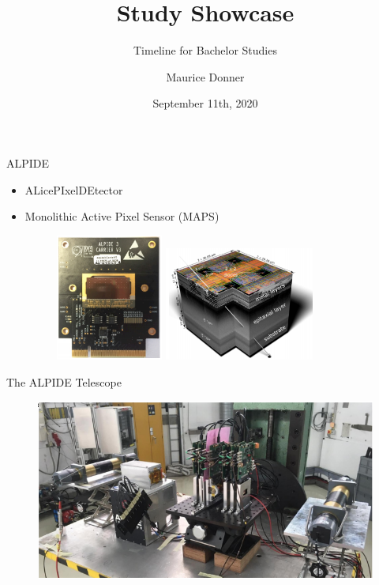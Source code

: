 \documentclass{beamer}
\title{\texorpdfstring{\color{blue!50!black}\textbf{Study Showcase}}{}}
\subtitle{Timeline for Bachelor Studies}
\author{Maurice Donner}
\date{September 11th, 2020}
\begin{document}
\begin{frame}{ALPIDE}
    \begin{itemize}
	\item ALicePIxelDEtector
	\item Monolithic Active Pixel Sensor (MAPS) \\[.5cm]
	    \begin{figure}[H]
		\centering
		\includegraphics[width=100pt]{ALPIDE.png}
		\quad
		\includegraphics[width=140pt]{3D.png}
	    \end{figure}
    \end{itemize}
\end{frame}

\begin{frame}{The ALPIDE Telescope}
    \begin{figure}[H]
	\centering
	\includegraphics[width=\textwidth]{Telescope.png}
    \end{figure}
\end{frame}
\end{document}
